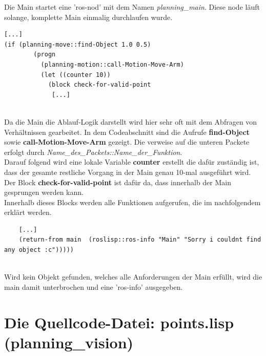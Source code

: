 \documentclass{suturo}
\begin{document}
Die Main startet eine 'ros-nod' mit dem Namen \textit{planning\_main}. Diese node läuft solange, komplette Main einmalig durchlaufen wurde.

\noindent             
\begin{minipage}{\linewidth}
\begin{lstlisting}
[...]
(if (planning-move::find-Object 1.0 0.5)
        (progn
          (planning-motion::call-Motion-Move-Arm)
          (let ((counter 10))
            (block check-for-valid-point 
             [...]
                                                   
\end{lstlisting}
\end{minipage}             

Da die Main die Ablauf-Logik darstellt wird hier sehr oft mit dem Abfragen von Verhältnissen gearbeitet. In dem Codeabschnitt sind die Aufrufe \textbf{find-Object} sowie \textbf{call-Motion-Move-Arm} gezeigt. Die verweise auf die unteren Packete erfolgt durch \textit{Name\_des\_Packets::Name\_der\_Funktion}. \\
Darauf folgend wird eine lokale Variable \textbf{counter} erstellt die dafür zuständig ist, dass der gesamte restliche Vorgang in der Main genau 10-mal ausgeführt wird. \\
Der Block \textbf{check-for-valid-point} ist dafür da, dass innerhalb der Main gesprungen werden kann.\\

Innerhalb dieses Blocks werden alle Funktionen aufgerufen, die im nachfolgendem erklärt werden.
           
\noindent
\begin{minipage}{\linewidth}
\begin{lstlisting}
    [...]
    (return-from main  (roslisp::ros-info "Main" "Sorry i couldnt find any object :c")))))                         
    
\end{lstlisting}
\end{minipage}    

Wird kein Objekt gefunden, welches alle Anforderungen der Main erfüllt, wird die main damit unterbrochen und eine 'ros-info' ausgegeben.



\section{Die Quellcode-Datei: points.lisp (planning\_vision)}
\end{document}

